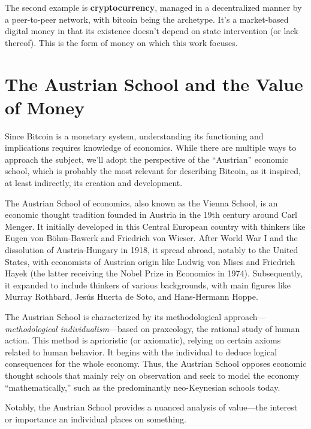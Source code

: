 \documentclass[
  a5paper,
  smalldemyvopaper,10pt,twoside,onecolumn,openright,extrafontsizes,hidelinks]{memoir}
\begin{document}
The second example is \textbf{cryptocurrency}, managed in a
decentralized manner by a peer-to-peer network, with bitcoin being the
archetype. It's a market-based digital money in that its existence
doesn't depend on state intervention (or lack thereof). This is the form
of money on which this work focuses.

\section*{The Austrian School and the Value of
Money}\label{lecole-autrichienne-et-la-valeur-de-la-monnaie}


Since Bitcoin is a monetary system, understanding its functioning and
implications requires knowledge of economics. While there are multiple
ways to approach the subject, we'll adopt the perspective of the
``Austrian'' economic school, which is probably the most relevant for
describing Bitcoin, as it inspired, at least indirectly, its creation
and development.

The Austrian School of economics, also known as the Vienna School, is an
economic thought tradition founded in Austria in the 19th century around
Carl Menger. It initially developed in this Central European country
with thinkers like Eugen von Böhm-Bawerk and Friedrich von Wieser. After
World War I and the dissolution of Austria-Hungary in 1918, it spread
abroad, notably to the United States, with economists of Austrian origin
like Ludwig von Mises and Friedrich Hayek (the latter receiving the
Nobel Prize in Economics in 1974). Subsequently, it expanded to include
thinkers of various backgrounds, with main figures like Murray Rothbard,
Jesús Huerta de Soto, and Hans-Hermann Hoppe.

The Austrian School is characterized by its methodological
approach---\emph{methodological individualism}---based on praxeology,
the rational study of human action. This method is aprioristic (or
axiomatic), relying on certain axioms related to human behavior. It
begins with the individual to deduce logical consequences for the whole
economy. Thus, the Austrian School opposes economic thought schools that
mainly rely on observation and seek to model the economy
``mathematically,'' such as the predominantly neo-Keynesian schools
today.

Notably, the Austrian School provides a nuanced analysis of value---the
interest or importance an individual places on something.
\end{document}
